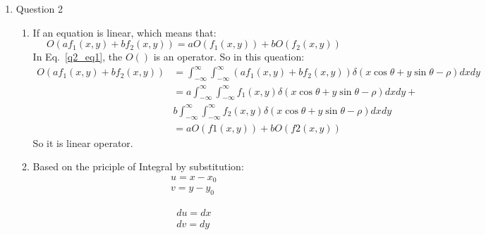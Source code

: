 \documentclass[12pt]{article}
\begin{document}
\begin{enumerate}[leftmargin=\labelsep]
\item Question 2

\begin{enumerate}
    \item  If an equation is linear, which means that:
    \begin{equation}
        O(af_{1}(x, y) + bf_{2}(x, y)) = aO(f_{1}(x, y)) + bO(f_{2}(x, y))
        \label{q2_eq1}
    \end{equation}
    In Eq.~\ref{q2_eq1}, the $O()$ is an operator.
    So in this queation:
    \begin{equation}
        \begin{aligned}
        O(af_{1}(x, y) + bf_{2}(x, y))
        &= \int_{-\infty}^{\infty}\int_{-\infty}^{\infty}(af_1(x, y) + bf_2(x, y))\delta(x\cos\theta + y\sin\theta - \rho)dxdy\\
        &= a\int_{-\infty}^{\infty}\int_{-\infty}^{\infty}f_1(x, y)\delta(x\cos\theta + y\sin\theta - \rho)dxdy + \\
        & b\int_{-\infty}^{\infty}\int_{-\infty}^{\infty}f_2(x, y)\delta(x\cos\theta + y\sin\theta - \rho)dxdy\\
        &= aO(f1(x, y)) + bO(f2(x, y))
        \end{aligned}
    \end{equation}
    So it is linear operator.

    \item Based on the priciple of Integral by substitution:
    \begin{equation}
     \begin{aligned}
        u = x - x_0\\
        v = y - y_0
        \end{aligned}
    \end{equation}

    \begin{equation}
        \begin{aligned}
            du = dx \\
            dv = dy
        \end{aligned}
    \end{equation}


\end{enumerate}
\end{enumerate}
\end{document}
